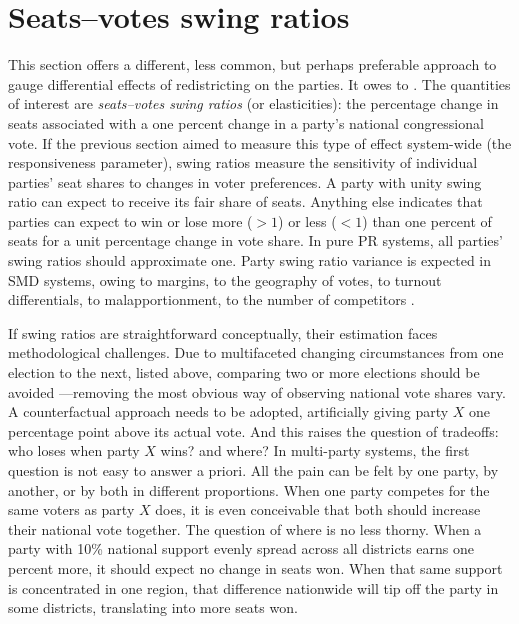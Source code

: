 \documentclass[letter,12pt]{article}
\begin{document}
\section{Seats--votes swing ratios}

This section offers a different, less common, but perhaps preferable approach to gauge differential effects of redistricting on the parties. It owes to \citet{niemi.fett1986swing}. The quantities of interest are \emph{seats--votes swing ratios} (or elasticities): the percentage change in seats associated with a one percent change in a party's national congressional vote. If the previous section aimed to measure this type of effect system-wide (the responsiveness parameter), swing ratios measure the sensitivity of individual parties’ seat shares to changes in voter preferences. A party with unity swing ratio can expect to receive its fair share of seats. Anything else indicates that parties can expect to win or lose more ($>1$) or less ($<1$) than one percent of seats for a unit percentage change in vote share. In pure PR systems, all parties' swing ratios should approximate one. Party swing ratio variance is expected in SMD systems, owing to margins, to the geography of votes, to turnout differentials, to malapportionment, to the number of competitors \citep{taagepera.shugart.1989}.

If swing ratios are straightforward conceptually, their estimation faces methodological challenges. Due to multifaceted changing circumstances from one election to the next, listed above, comparing two or more elections should be avoided \citep{jackmanMeasuringBias1994,niemi.fett1986swing}---removing the most obvious way of observing national vote shares vary. A counterfactual approach needs to be adopted, artificially giving party $X$ one percentage point above its actual vote. And this raises the question of tradeoffs: who loses when party $X$ wins? and where? In multi-party systems, the first question is not easy to answer a priori. All the pain can be felt by one party, by another, or by both in different proportions. When one party competes for the same voters as party $X$ does, it is even conceivable that both should increase their national vote together. The question of where is no less thorny. When a party with 10\% national support evenly spread across all districts earns one percent more, it should expect no change in seats won. When that same support is concentrated in one region, that difference nationwide will tip off the party in some districts, translating into more seats won.  
\end{document}
